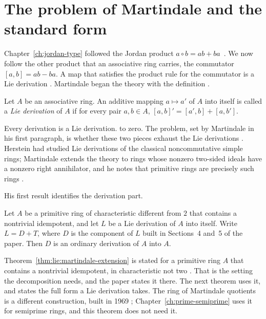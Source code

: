 \section{The problem of Martindale and the standard form}\label{sec:lie-type:martindale}

Chapter~\ref{ch:jordan-type} followed the Jordan product $a\circ b=ab+ba$~\cite[p.~183]{Martindale1964}. We
now follow the other product that an associative ring carries, the commutator
$[a,b]=ab-ba$. A map that satisfies the product rule for the commutator is a
Lie derivation \cite[p.~183]{Martindale1964}. Martindale began the theory with
the definition \cite[p.~183]{Martindale1964}.

\begin{definition}\label{def:lie:martindale}
Let $A$ be an associative ring. An additive mapping $a\mapsto a'$ of $A$ into itself is
called a \emph{Lie derivation} of $A$ if for every pair $a,b\in A$,
$[a,b]'=[a',b]+[a,b']$.
\end{definition}

Every derivation is a Lie derivation.
to zero. The problem, set by Martindale in his first paragraph, is whether
these two pieces exhaust the Lie derivations \cite[p.~183]{Martindale1964}.
Herstein had studied Lie derivations of the classical noncommutative simple
rings; Martindale extends the theory to rings whose nonzero two-sided ideals
have a nonzero right annihilator, and he notes that primitive rings are
precisely such rings \cite[p.~183]{Martindale1964}.

His first result identifies the derivation part.

\begin{theorem}\label{thm:lie:martindale-extension}
Let $A$ be a primitive ring of characteristic different from $2$ that contains a
nontrivial idempotent, and let $L$ be a Lie derivation of $A$ into itself. Write
$L=D+T$, where $D$ is the component of $L$ built in Sections~4 and~5 of the paper.
Then $D$ is an ordinary derivation of $A$ into $A$.
\end{theorem}

Theorem~\ref{thm:lie:martindale-extension} is stated for a primitive ring $A$
that contains a nontrivial idempotent, in characteristic not two
\cite[p.~183]{Martindale1964}.
That is the setting the decomposition needs, and the paper states it there.
The next theorem uses it, and states the full form a Lie derivation takes.
The ring of Martindale quotients is a different construction, built in 1969
\cite[p.~576]{Martindale1969}; Chapter~\ref{ch:prime-semiprime} uses it for
semiprime rings, and this theorem does not need it.

